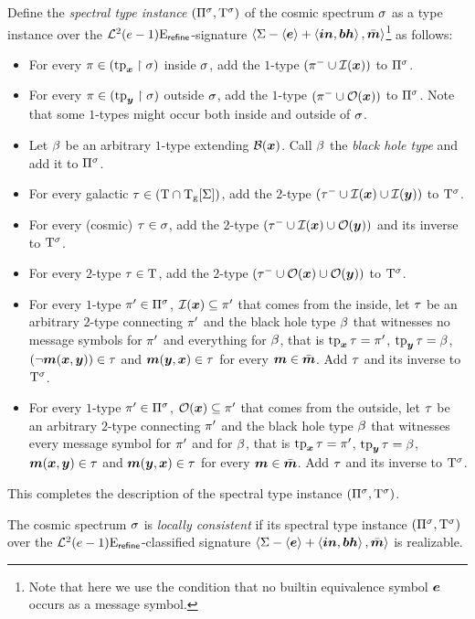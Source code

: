 \begin{definition}
Define the \emph{spectral type instance} $(\Pi^{\sigma},\mathrm{T}^{\sigma})$ of the
cosmic spectrum $\sigma$ as a type instance over the $\mathcal{L}^{2}_{{}}{(e-1)}\mathrm{E}_{\mathsf{refine}}$-signature 
$\left\langle \mathrm{\Sigma} - \left\langle \bm{e} \right\rangle + \left\langle \bm{in},\bm{bh} \right\rangle,\bar{\bm{m}} \right\rangle$\footnote{Note that here we use
the condition that no builtin equivalence symbol $\bm{e}$ occurs as a message
symbol.} as follows:
\begin{itemize}
  \item[\sticondI]\label{sti-I}
  For every $\pi \in (\operatorname{tp}_{\bm{x}}\restriction\sigma)$ inside $\sigma$, add the
  $1$-type $(\pi^{-} \cup \mathcal{I}(\bm{x}))$ to $\Pi^{\sigma}$.
  \item[\sticondO]\label{sti-O}
  For every $\pi \in (\operatorname{tp}_{\bm{y}}\restriction\sigma)$ outside $\sigma$, add the
  $1$-type $(\pi^{-} \cup \mathcal{O}(\bm{x}))$ to $\Pi^{\sigma}$. Note that some
  $1$-types might occur both inside and outside of $\sigma$.
  \item[\sticondB]\label{sti-B}
  Let $\beta$ be an arbitrary $1$-type extending $\mathcal{B}(\bm{x})$.
  Call $\beta$ the \emph{black hole type} and add it to $\Pi^{\sigma}$.
  \item[\sticondII]\label{sti-II}
  For every galactic $\tau \in (\mathrm{T} \cap \mathrm{T}_{\mathrm{g}}[\mathrm{\Sigma}])$, add the $2$-type
  $(\tau^{-} \cup \mathcal{I}(\bm{x}) \cup \mathcal{I}(\bm{y}))$ to $\mathrm{T}^{\sigma}$.
  \item[\sticondIO]\label{sti-IO}
  For every (cosmic) $\tau \in \sigma$, add the $2$-type
  $(\tau^{-} \cup \mathcal{I}(\bm{x}) \cup \mathcal{O}(\bm{y}))$ and its inverse to $\mathrm{T}^{\sigma}$.
  \item[\sticondOO]\label{sti-OO}
  For every $2$-type $\tau \in \mathrm{T}$, add the $2$-type
  $(\tau^{-} \cup \mathcal{O}(\bm{x}) \cup \mathcal{O}(\bm{y}))$ to $\mathrm{T}^{\sigma}$.
  \item[\sticondIB]\label{sti-IB}
  For every $1$-type ${\pi'} \in \Pi^{\sigma}$, $\mathcal{I}(\bm{x}) \subseteq {\pi'}$ that
  comes from the inside, let $\tau$ be an arbitrary $2$-type connecting ${\pi'}$ and the black hole type $\beta$ that witnesses no
  message symbols for ${\pi'}$ and everything for $\beta$, that is
  $\operatorname{tp}_{\bm{x}}\tau = {\pi'}$, $\operatorname{tp}_{\bm{y}}\tau = \beta$, $(\lnot\bm{m}(\bm{x},\bm{y})) \in \tau$ and
  $\bm{m}(\bm{y},\bm{x}) \in \tau$ for every $\bm{m} \in \bar{\bm{m}}$. Add $\tau$ and its inverse
  to $\mathrm{T}^{\sigma}$.
  \item[\sticondOB]\label{sti-OB}
  For every $1$-type ${\pi'} \in \Pi^{\sigma}$, $\mathcal{O}(\bm{x}) \subseteq {\pi'}$
  that comes from the outside, let $\tau$ be an arbitrary $2$-type connecting
  ${\pi'}$ and the black hole type $\beta$ that witnesses every message symbol for ${\pi'}$ and for $\beta$, that is
  $\operatorname{tp}_{\bm{x}}\tau = {\pi'}$, $\operatorname{tp}_{\bm{y}}\tau = \beta$, $\bm{m}(\bm{x},\bm{y}) \in \tau$ and
  $\bm{m}(\bm{y},\bm{x}) \in \tau$ for every $\bm{m} \in \bar{\bm{m}}$. Add $\tau$ and its inverse
  to $\mathrm{T}^{\sigma}$.
\end{itemize}
This completes the description of the spectral type instance
$(\Pi^{\sigma},\mathrm{T}^{\sigma})$.

The cosmic spectrum $\sigma$ is \emph{locally consistent} if its spectral type
instance $(\Pi^{\sigma},\mathrm{T}^{\sigma})$ over the
$\mathcal{L}^{2}_{{}}{(e-1)}\mathrm{E}_{\mathsf{refine}}$-classified signature
$\left\langle \mathrm{\Sigma} - \left\langle \bm{e} \right\rangle + \left\langle \bm{in}, \bm{bh} \right\rangle,\bar{\bm{m}} \right\rangle$ is realizable.
\end{definition}
